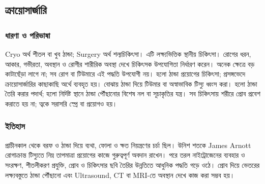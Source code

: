 \subsection{ক্রায়োসার্জারি}
\label{sec:ch1-cryosurgery}
\subsubsection{ধারণা ও পরিভাষা}
Cryo অর্থ শীতল বা খুব ঠান্ডা; Surgery অর্থ শল্যচিকিৎসা। এটি লক্ষ্যভিত্তিক স্থানীয় চিকিৎসা। রোগের ধরন, আকার, গভীরতা, অবস্থান ও রোগীর শারীরিক অবস্থা দেখে চিকিৎসক উপযোগিতা নির্ধারণ করেন। অনেক ক্ষেত্রে বড় কাটাছেঁড়া লাগে না; সব রোগ বা টিউমারে এই পদ্ধতি উপযোগী নয়।
 হলো ঠান্ডা প্রয়োগের চিকিৎসা; প্রসঙ্গভেদে ক্রায়োসার্জারির কাছাকাছি অর্থে ব্যবহৃত হয়।  বোঝায় ঠান্ডা দিয়ে টিউমার বা অস্বাভাবিক টিস্যু ধ্বংস করা।  হলো ঠান্ডা তৈরি করার পদার্থ;  হলো নির্দিষ্ট স্থানে ঠান্ডা পৌঁছানোর বিশেষ নল বা সূচাকৃতির যন্ত্র। সব চিকিৎসায় শরীরে প্রোব প্রবেশ করাতে হয় না; ত্বকে সরাসরি স্প্রে বা প্রয়োগও হয়।

\subsubsection{ইতিহাস}
প্রাচীনকাল থেকে বরফ ও ঠান্ডা দিয়ে ব্যথা, ফোলা ও ক্ষত নিয়ন্ত্রণের চর্চা ছিল। উনিশ শতকে James Arnott রোগাক্রান্ত টিস্যুতে নিম্ন তাপমাত্রা প্রয়োগের কাজে গুরুত্বপূর্ণ অবদান রাখেন। পরে তরল নাইট্রোজেনের ব্যবহার ও সংরক্ষণ, শীতলীকরণ প্রযুক্তি, প্রোব ও চিকিৎসার ছবি তৈরির উন্নতিতে আধুনিক পদ্ধতি গড়ে ওঠে। প্রোব দিয়ে ভেতরের লক্ষ্যবস্তুতে ঠান্ডা পৌঁছানো এবং Ultrasound, CT বা MRI-তে অবস্থান দেখে কাজ করা সম্ভব হয়।
